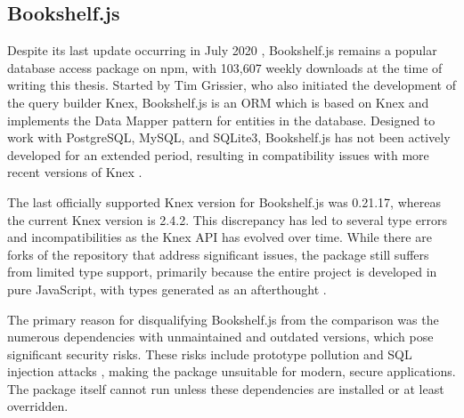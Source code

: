 \subsection{Bookshelf.js}

Despite its last update occurring in July 2020 \cite{bookshelfNpm}, Bookshelf.js
remains a popular database access package on npm, with 103,607 weekly downloads
at the time of writing this thesis. Started by Tim Grissier, who also initiated
the development of the query builder Knex, Bookshelf.js is an ORM which is based
on Knex and implements the Data Mapper pattern for entities in the database.
Designed to work with PostgreSQL, MySQL, and SQLite3, Bookshelf.js has not been
actively developed for an extended period, resulting in compatibility issues
with more recent versions of Knex \cite{bookshelfGitHub}.

The last officially supported Knex version for Bookshelf.js was 0.21.17, whereas
the current Knex version is 2.4.2. This discrepancy has led to several type
errors and incompatibilities as the Knex API has evolved over time. While there
are forks of the repository that address significant issues, the package still
suffers from limited type support, primarily because the entire project is
developed in pure JavaScript, with types generated as an afterthought
\cite{bookshelfDocs}.

The primary reason for disqualifying Bookshelf.js from the comparison was the
numerous dependencies with unmaintained and outdated versions, which pose
significant security risks. These risks include prototype pollution
\cite{cve-2019-10744} and SQL injection attacks \cite{cve-2016-20018}, making
the package unsuitable for modern, secure applications. The package itself
cannot run unless these dependencies are installed or at least overridden.
